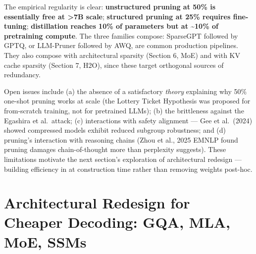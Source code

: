 The empirical regularity is clear: \textbf{unstructured pruning at 50\% is essentially free at \textgreater7B scale}; \textbf{structured pruning at 25\% requires fine-tuning}; \textbf{distillation reaches 10\% of parameters but at \textasciitilde10\% of pretraining compute}. The three families compose: SparseGPT followed by GPTQ, or LLM-Pruner followed by AWQ, are common production pipelines. They also compose with architectural sparsity (Section 6, MoE) and with KV cache sparsity (Section 7, H2O), since these target orthogonal sources of redundancy.

Open issues include (a) the absence of a satisfactory \emph{theory} explaining why 50\% one-shot pruning works at scale (the Lottery Ticket Hypothesis was proposed for from-scratch training, not for pretrained LLMs); (b) the brittleness against the Egashira et al.~attack; (c) interactions with safety alignment --- Gee et al.~(2024) showed compressed models exhibit reduced subgroup robustness; and (d) pruning's interaction with reasoning chains (Zhou et al., 2025 EMNLP found pruning damages chain-of-thought more than perplexity suggests). These limitations motivate the next section's exploration of architectural redesign --- building efficiency in at construction time rather than removing weights post-hoc.

\section{Architectural Redesign for Cheaper Decoding: GQA, MLA, MoE, SSMs}\label{architectural-redesign-for-cheaper-decoding-gqa-mla-moe-ssms}

